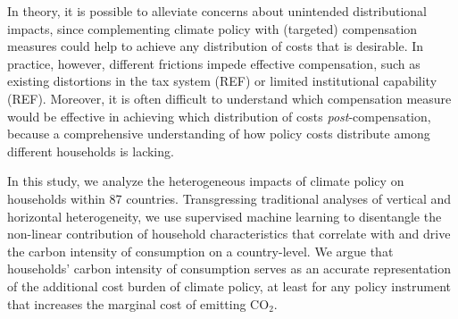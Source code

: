 \documentclass[12pt, a4paper]{article}
\begin{document}
In theory, it is possible to alleviate concerns about unintended distributional impacts, since complementing climate policy with (targeted) compensation measures could help to achieve any distribution of costs that is desirable. In practice, however, different frictions impede effective compensation, such as existing distortions in the tax system (REF) or limited institutional capability (REF). %
Moreover, it is often difficult to understand which compensation measure would be effective in achieving which distribution of costs \textit{post}-compensation, because a comprehensive understanding of how policy costs distribute among different households is lacking.

In this study, we analyze the heterogeneous impacts of climate policy on households within 87 countries. Transgressing traditional analyses of vertical and horizontal heterogeneity, we use supervised machine learning to disentangle the non-linear contribution of household characteristics that correlate with and drive the carbon intensity of consumption on a country-level. We argue that households' carbon intensity of consumption serves as an accurate representation of the additional cost burden of climate policy, at least for any policy instrument that increases the marginal cost of emitting CO$_{2}$.

\end{document}
